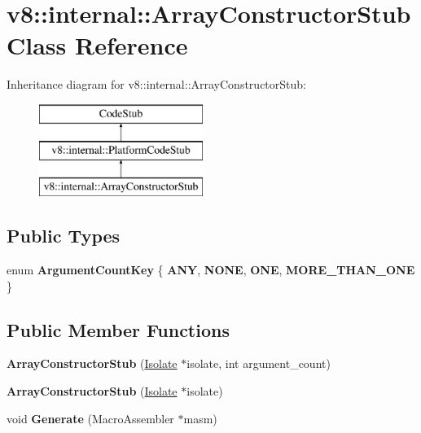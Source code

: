 \hypertarget{classv8_1_1internal_1_1_array_constructor_stub}{}\section{v8\+:\+:internal\+:\+:Array\+Constructor\+Stub Class Reference}
\label{classv8_1_1internal_1_1_array_constructor_stub}
Inheritance diagram for v8\+:\+:internal\+:\+:Array\+Constructor\+Stub\+:\begin{figure}[H]
\begin{center}
\leavevmode
\includegraphics[height=3.000000cm]{classv8_1_1internal_1_1_array_constructor_stub}
\end{center}
\end{figure}
\subsection*{Public Types}
\begin{DoxyCompactItemize}
\item 
\hypertarget{classv8_1_1internal_1_1_array_constructor_stub_ad22d0f4b8c460b9c3cd6f1f96222a05f}{}enum {\bfseries Argument\+Count\+Key} \{ {\bfseries A\+N\+Y}, 
{\bfseries N\+O\+N\+E}, 
{\bfseries O\+N\+E}, 
{\bfseries M\+O\+R\+E\+\_\+\+T\+H\+A\+N\+\_\+\+O\+N\+E}
 \}\label{classv8_1_1internal_1_1_array_constructor_stub_ad22d0f4b8c460b9c3cd6f1f96222a05f}

\end{DoxyCompactItemize}
\subsection*{Public Member Functions}
\begin{DoxyCompactItemize}
\item 
\hypertarget{classv8_1_1internal_1_1_array_constructor_stub_ace8064ca0370fc661e2c52326016d7df}{}{\bfseries Array\+Constructor\+Stub} (\hyperlink{classv8_1_1internal_1_1_isolate}{Isolate} $\ast$isolate, int argument\+\_\+count)\label{classv8_1_1internal_1_1_array_constructor_stub_ace8064ca0370fc661e2c52326016d7df}

\item 
\hypertarget{classv8_1_1internal_1_1_array_constructor_stub_a091aa6dc4cd77eb388afaea10ea0a0d1}{}{\bfseries Array\+Constructor\+Stub} (\hyperlink{classv8_1_1internal_1_1_isolate}{Isolate} $\ast$isolate)\label{classv8_1_1internal_1_1_array_constructor_stub_a091aa6dc4cd77eb388afaea10ea0a0d1}

\item 
\hypertarget{classv8_1_1internal_1_1_array_constructor_stub_afe9c35f76257c57c434f1ae1e375d9f8}{}void {\bfseries Generate} (Macro\+Assembler $\ast$masm)\label{classv8_1_1internal_1_1_array_constructor_stub_afe9c35f76257c57c434f1ae1e375d9f8}

\end{DoxyCompactItemize}
